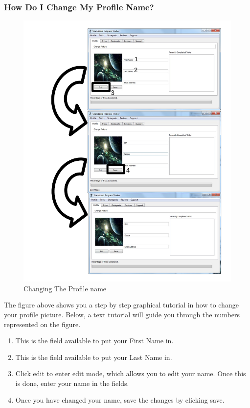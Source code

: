 \subsubsection{How Do I Change My Profile Name?}

\begin{figure}[H]
    \includegraphics[width=\textwidth]{./Manual/Images/ChangeName.pdf}
    \caption{Changing The Profile name} \label{fig:Change Name}
\end{figure}

The figure above shows you a step by step graphical tutorial in how to change your profile picture. Below, a text tutorial will guide you through the numbers represented on the figure.

\begin{enumerate}
\item This is the field available to put your First Name in.
\item This is the field available to put your Last Name in.
\item Click edit to enter edit mode, which allows you to edit your name. Once this is done, enter your name in the fields.
\item Once you have changed your name, save the changes by clicking save.
\end{enumerate}

